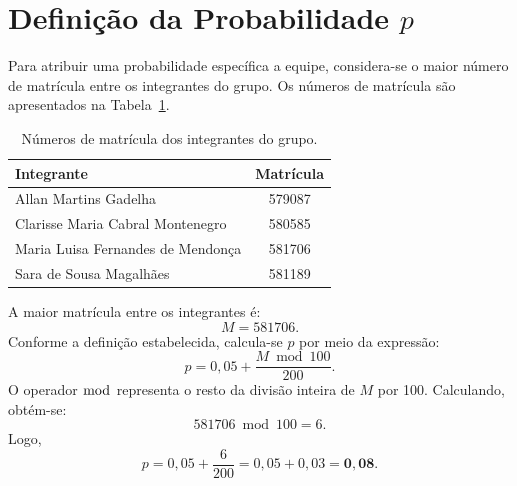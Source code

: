 \documentclass[12pt,a4paper]{article}
\begin{document}
\section{Definição da Probabilidade $p$}
Para atribuir uma probabilidade específica a equipe, considera-se o
maior número de matrícula entre os integrantes do grupo. Os números de
matrícula são apresentados na Tabela~\ref{tab:matriculas}.

\begin{table}[h]
\centering
\begin{tabular}{lc}
\hline
\textbf{Integrante} & \textbf{Matrícula} \\
\hline
Allan Martins Gadelha & 579087 \\
Clarisse Maria Cabral Montenegro & 580585 \\
Maria Luisa Fernandes de Mendonça & 581706 \\
Sara de Sousa Magalhães & 581189 \\
\hline
\end{tabular}
\caption{Números de matrícula dos integrantes do grupo.}
\label{tab:matriculas}
\end{table}

A maior matrícula entre os integrantes é:
\[
M = 581706.
\]
Conforme a definição estabelecida, calcula-se $p$ por meio da expressão:
\[
p = 0{,}05 + \frac{M \bmod 100}{200}.
\]
O operador $\bmod$ representa o resto da divisão inteira de $M$ por 100.
Calculando, obtém-se:
\[
581706 \bmod 100 = 6.
\]
Logo,
\[
p = 0{,}05 + \frac{6}{200} = 0{,}05 + 0{,}03 = \mathbf{0{,}08}.
\]
\end{document}
